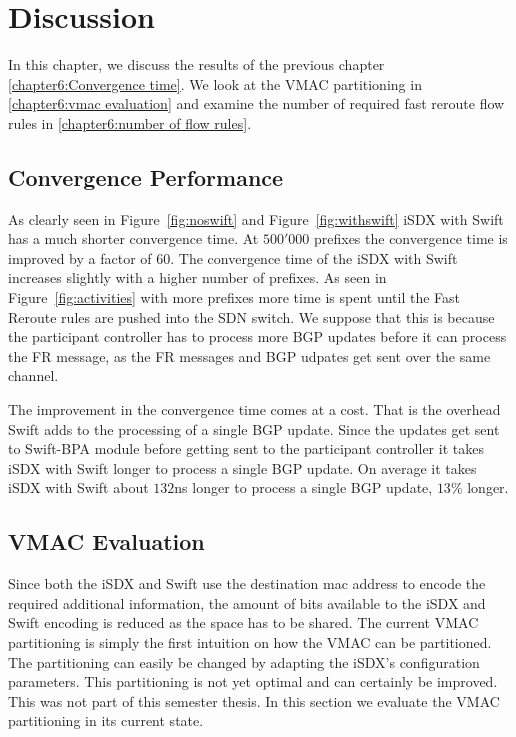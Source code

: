 \chapter{\label{chapter6}Discussion}

In this chapter, we discuss the results of the previous chapter \ref{chapter6:Convergence time}. We look at the VMAC partitioning in \ref{chapter6:vmac evaluation} and examine the number of required fast reroute flow rules in \ref{chapter6:number of flow rules}.

\section{\label{chapter6:Convergence time}Convergence Performance}

As clearly seen in Figure~\ref{fig:noswift} and Figure~\ref{fig:withswift} iSDX with Swift has a much shorter convergence time. At $500'000$ prefixes the convergence time is improved by a factor of $60$. The convergence time of the iSDX with Swift increases slightly with a higher number of prefixes. As seen in Figure~\ref{fig:activities} with more prefixes more time is spent until the Fast Reroute rules are pushed into the SDN switch. We suppose that this is because the participant controller has to process more BGP updates before it can process the FR message, as the FR messages and BGP udpates get sent over the same channel.

The improvement in the convergence time comes at a cost. That is the overhead Swift adds to the processing of a single BGP update. Since the updates get sent to Swift-BPA module before getting sent to the participant controller it takes iSDX with Swift longer to process a single BGP update. On average it takes iSDX with Swift about $132$ns longer to process a single BGP update, $13\%$ longer. 

\section{\label{chapter6:vmac evaluation}VMAC Evaluation}

Since both the iSDX and Swift use the destination mac address to encode the required additional information, the amount of bits available to the iSDX and Swift encoding is reduced as the space has to be shared. The current VMAC partitioning is simply the first intuition on how the VMAC can be partitioned. The partitioning can easily be changed by adapting the iSDX's configuration parameters. This partitioning is not yet optimal and can certainly be improved. This was not part of this semester thesis. In this section we evaluate the VMAC partitioning in its current state.

